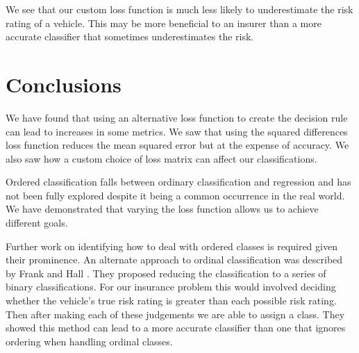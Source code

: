 We see that our custom loss function is much less likely to underestimate the risk rating of a vehicle.
This may be more beneficial to an insurer than a more accurate classifier that sometimes underestimates the risk.

\section{Conclusions}

We have found that using an alternative loss function to create the decision rule can lead to increases in some metrics.
We saw that using the squared differences loss function reduces the mean squared error but at the expense of accuracy.
We also saw how a custom choice of loss matrix can affect our classifications.

Ordered classification falls between ordinary classification and regression and has not been fully explored despite it being a common occurrence in the real world.
We have demonstrated that varying the loss function allows us to achieve different goals.

Further work on identifying how to deal with ordered classes is required given their prominence.
An alternate approach to ordinal classification was described by Frank and Hall \cite{Frank01}.
They proposed reducing the classification to a series of binary classifications.
For our insurance problem this would involved deciding whether the vehicle's true risk rating is greater than each possible risk rating.
Then after making each of these judgements we are able to assign a class.
They showed this method can lead to a more accurate classifier than one that ignores ordering when handling ordinal classes.